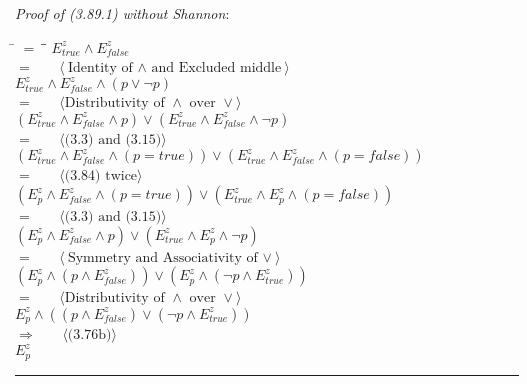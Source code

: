 \documentclass[12pt, fleqn, leqno]{article}
\newcommand{\lgap}{2pt}                             %
\newcommand{\mymathindent}{24pt}                    %
\newcommand{\impl}{\ensuremath{\Rightarrow}}        %
\newcommand{\myqed}{\rule[-.23ex]{1.2ex}{2.0ex}}
\newcommand{\myqedtab}{\hspace{384pt}}              %
\newcommand{\Gll} {\langle}                         %
\newcommand{\Ggg} {\rangle}                         %
\newcommand{\Hint}[1]     {\ \ \ $\Gll              \mbox{#1} \Ggg$ }   %
\begin{document}
\emph{Proof of (3.89.1) without Shannon}:
\begin{tabbing}
\hspace{\mymathindent} \= $= \;$ \= \myqedtab \= \kill
	\> \>  $E^{z}_{true}\land E^{z}_{false}$\\
	\> $=$  \>  \Hint{Identity of $\land$ and Excluded middle}\\[\lgap]
	\> \>   $E^{z}_{true}\land E^{z}_{false}\land(p\lor\lnot p)$\\
	\> $=$  \>  \Hint{Distributivity of $\land$ over $\lor$}\\[\lgap]
	\> \>   $(E^{z}_{true}\land E^{z}_{false}\land p)\lor(E^{z}_{true}\land E^{z}_{false}\land\lnot p)$\\
	\> $=$  \>  \Hint{(3.3) and (3.15)}\\[\lgap]
	\> \>   $(E^{z}_{true}\land E^{z}_{false}\land (p=true))\lor(E^{z}_{true}\land E^{z}_{false}\land (p=false))$\\
	\> $=$  \>  \Hint{(3.84) twice}\\[\lgap]
	\> \>   $(E^{z}_{p}\land E^{z}_{false}\land (p=true))\lor(E^{z}_{true}\land E^{z}_{p}\land (p=false))$\\
	\> $=$  \>  \Hint{(3.3) and (3.15)}\\[\lgap]
	\> \>   $(E^{z}_{p}\land E^{z}_{false}\land p)\lor(E^{z}_{true}\land E^{z}_{p}\land\lnot p)$\\
	\> $=$  \>  \Hint{Symmetry and Associativity of $\lor$}\\[\lgap]
	\> \>  $(E^{z}_{p}\land (p\land E^{z}_{false}))\lor(E^{z}_{p}\land (\lnot p\land E^{z}_{true}))$\\
	\> $=$  \>  \Hint{Distributivity of $\land$ over $\lor$}\\[\lgap]
	\> \>   $E^{z}_{p}\land ((p\land E^{z}_{false})\lor (\lnot p\land E^{z}_{true}))$\\
	\> $\impl$  \>  \Hint{(3.76b)}\\[\lgap]
	\> \>   $E^{z}_{p}$ \quad \myqed \\

\end{tabbing}
\end{document}
